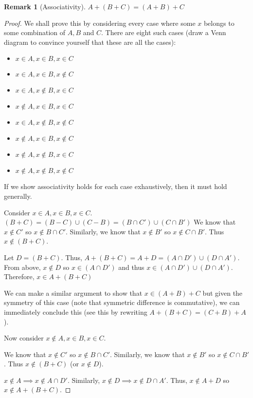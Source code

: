 \documentclass[12pt]{article}
\newtheorem{remark}{Remark}
\begin{document}
\begin{remark}[Associativity]
    $A + (B + C) = (A + B) + C$
\end{remark}
\begin{proof}
    We shall prove this by considering every case where some $x$ belongs to some combination of $A, B$
    and $C$. There are eight such cases (draw a Venn diagram to convince yourself that these are all the cases):
    \begin{itemize}
        \item $x \in A, x \in B, x \in C$
        \item $x \in A, x \in B, x \notin C$
        \item $x \in A, x \notin B, x \in C$
        \item $x \notin A, x \in B, x \in C$
        \item $x \in A, x \notin B, x \notin C$
        \item $x \notin A, x \in B, x \notin C$
        \item $x \notin A, x \notin B, x \in C$
        \item $x \notin A, x \notin B, x \notin C$
    \end{itemize}
    If we show associativity holds for each case exhaustively, then it must hold generally.

    Consider $x \in A, x \in B, x \in C$.
    $(B + C) = (B - C) \cup (C - B) = (B \cap C')\cup (C \cap B')$
    We know that $x \notin C'$ so $x \notin B \cap C'$. Similarly, we know that
    $x \notin B'$ so $x \notin C \cap B'$. Thus $x \notin (B + C)$.

    Let $D = (B + C)$. Thus, $A + (B + C) = A + D = (A \cap D')\cup (D \cap A')$.
    From above, $x \notin D$ so $x \in (A \cap D')$ and thus $x \in (A \cap D')\cup (D \cap A')$.
    Therefore, $x \in A + (B + C)$

    We can make a similar argument to show that $x \in (A + B) + C$ but given the symmetry of this case
    (note that symmetric difference is commutative), we can immediately conclude this (see this by rewriting
    $A + (B + C) = (C + B) + A$).

    Now consider $x \notin A, x \in B, x \in C$.

    We know that $x \notin C'$ so $x \notin B \cap C'$. Similarly, we know that
    $x \notin B'$ so $x \notin C \cap B'$. Thus $x \notin (B + C)$ (or $x \notin D$).

    $x \notin A \implies x \notin A \cap D'$. Similarly, $x \notin D \implies x \notin D \cap A'$.
    Thus, $x \notin A + D$ so $x \notin A + (B + C)$.


\end{proof}
\end{document}
